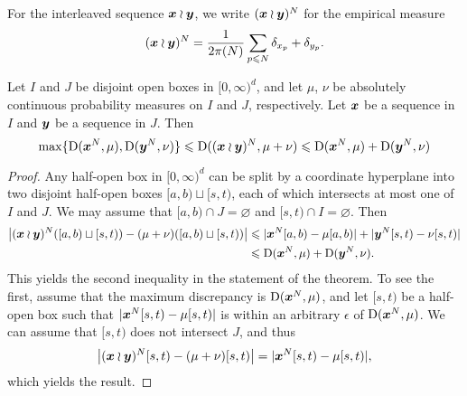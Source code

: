 For the interleaved sequence ${\boldsymbol x}\wr{\boldsymbol y}$, we write $({\boldsymbol x}\wr{\boldsymbol y})^N$ for the 
empirical measure 
\[
	({\boldsymbol x}\wr{\boldsymbol y})^N = \frac{1}{2\pi(N)} \sum_{p\leqslant N} \delta_{x_p} + \delta_{y_p} .
\]

\begin{theorem}\label{thm:wreath-seq}
Let $I$ and $J$ be disjoint open boxes in $[0,\infty)^d$, and let $\mu$, 
$\nu$ be absolutely continuous probability measures on $I$ and $J$, 
respectively. Let ${\boldsymbol x}$ be a sequence in $I$ and ${\boldsymbol y}$ be a sequence in $J$. 
Then 
\[
	\max\{\operatorname{D}({\boldsymbol x}^N,\mu),\operatorname{D}({\boldsymbol y}^N,\nu)\} \leqslant \operatorname{D}(({\boldsymbol x}\wr{\boldsymbol y})^N, \mu+\nu) \leqslant \operatorname{D}({\boldsymbol x}^N,\mu) + \operatorname{D}({\boldsymbol y}^N,\nu)
\]
\end{theorem}
\begin{proof}
Any half-open box in $[0,\infty)^d$ can be split by a coordinate 
hyperplane into two disjoint half-open boxes $[a,b)\sqcup [s,t)$, each of which 
intersects at most one of $I$ and $J$. We may assume that 
$[a,b)\cap J=\varnothing$ and $[s,t)\cap I = \varnothing$. Then 
\begin{align*}
	\left| ({\boldsymbol x}\wr{\boldsymbol y})^N([a,b)\sqcup [s,t)) - (\mu+\nu)([a,b)\sqcup[s,t))\right| 
		&\leqslant |{\boldsymbol x}^N[a,b) - \mu[a,b)| + |{\boldsymbol y}^N[s,t) - \nu[s,t)| \\
		&\leqslant \operatorname{D}({\boldsymbol x}^N,\mu) + \operatorname{D}({\boldsymbol y}^N,\nu) .
\end{align*}
This yields the second inequality in the statement of the theorem. To see the 
first, assume that the maximum discrepancy is $\operatorname{D}({\boldsymbol x}^N,\mu)$, and let 
$[s,t)$ be a half-open box such that $|{\boldsymbol x}^N[s,t) - \mu[s,t)|$ is within an 
arbitrary $\epsilon$ of $\operatorname{D}({\boldsymbol x}^N,\mu)$. We can assume that $[s,t)$ does not 
intersect $J$, and thus 
\[
	\left|({\boldsymbol x}\wr{\boldsymbol y})^N[s,t) - (\mu+\nu)[s,t)\right| = |{\boldsymbol x}^N[s,t) - \mu[s,t)| ,
\]
which yields the result. 
\end{proof}
